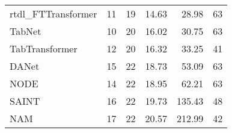 \begin{tabular}{lrrrrr}
rtdl_FTTransformer &                            11 &  19 &  14.63 &                    28.98 &    63 \\
TabNet             &                            10 &  20 &  16.02 &                    30.75 &    63 \\
TabTransformer     &                            12 &  20 &  16.32 &                    33.25 &    41 \\
DANet              &                            15 &  22 &  18.73 &                    53.09 &    63 \\
NODE               &                            14 &  22 &  18.95 &                    62.21 &    63 \\
SAINT              &                            16 &  22 &  19.73 &                   135.43 &    48 \\
NAM                &                            17 &  22 &  20.57 &                   212.99 &    42 \\
\bottomrule
\end{tabular}
